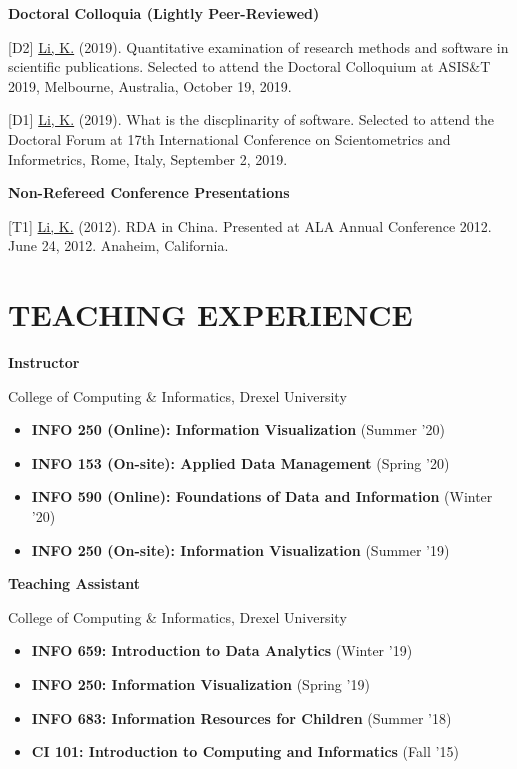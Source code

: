 \documentclass[margin, 10pt]{res} %
\begin{document}
\begin{resume}
\textbf{Doctoral Colloquia (Lightly Peer-Reviewed)}

[D2] \underline{Li, K.} (2019). Quantitative examination of research methods and software in scientific publications. Selected to attend the Doctoral Colloquium at ASIS\&T 2019, Melbourne, Australia, October 19, 2019.

[D1] \underline{Li, K.} (2019). What is the discplinarity of software. Selected to attend the Doctoral Forum at 17th International Conference on Scientometrics and Informetrics, Rome, Italy, September 2, 2019.

\textbf{Non-Refereed Conference Presentations}

[T1] \underline{Li, K.} (2012). RDA in China. Presented at ALA Annual Conference 2012. June 24, 2012. Anaheim, California.

\section{TEACHING EXPERIENCE}

\textbf{Instructor}

College of Computing \& Informatics, Drexel University

\begin{itemize}
\item \textbf{INFO 250 (Online): Information Visualization} (Summer '20)
\item \textbf{INFO 153 (On-site): Applied Data Management} (Spring '20)
\item \textbf{INFO 590 (Online): Foundations of Data and Information} (Winter '20)
\item \textbf{INFO 250 (On-site): Information Visualization} (Summer '19)
\end{itemize}

\textbf{Teaching Assistant}

College of Computing \& Informatics, Drexel University

\begin{itemize}
\item \textbf{INFO 659: Introduction to Data Analytics} (Winter '19)
\item \textbf{INFO 250: Information Visualization} (Spring '19)
\item \textbf{INFO 683: Information Resources for Children} (Summer '18)
\item \textbf{CI 101: Introduction to Computing and Informatics} (Fall '15)
\end{itemize}


\end{resume}
\end{document}
